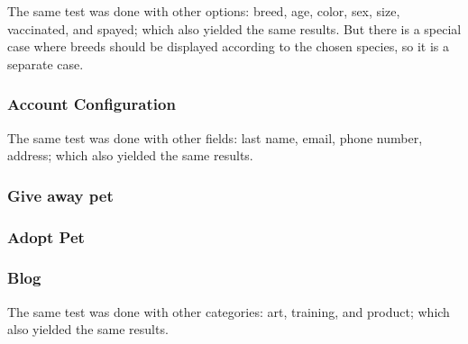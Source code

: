 

The same test was done with other options: breed, age, color, sex, size, vaccinated, and spayed; which also yielded the same results. But there is a special case where breeds should be displayed according to the chosen species, so it is a separate case.



\subsubsection*{Account Configuration}





The same test was done with other fields: last name, email, phone number, address; which also yielded the same results.

\subsubsection*{Give away pet}









\subsubsection*{Adopt Pet}







\subsubsection*{Blog}





The same test was done with other categories: art, training, and product; which also yielded the same results.

